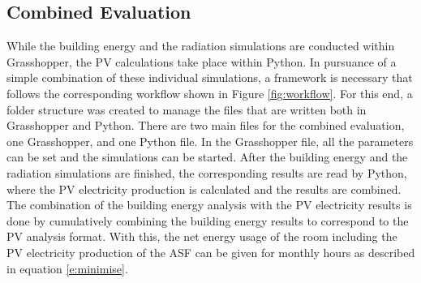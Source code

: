 		\subsection{Combined Evaluation}


			While the building energy and the radiation simulations are conducted within Grasshopper, the PV calculations take place within Python. In pursuance of a simple combination of these individual simulations, a framework is necessary that follows the corresponding workflow shown in Figure \ref{fig:workflow}. For this end, a folder structure was created to manage the files that are written both in Grasshopper and Python. There are two main files for the combined evaluation, one Grasshopper, and one Python file. In the Grasshopper file, all the parameters can be set and the simulations can be started. After the building energy and the radiation simulations are finished, the corresponding results are read by Python, where the PV electricity production is calculated and the results are combined. The combination of the building energy analysis with the PV electricity results is done by cumulatively combining the building energy results to correspond to the PV analysis format. With this, the net energy usage of the room including the PV electricity production of the ASF can be given for monthly hours as described in equation \ref{e:minimise}. 
